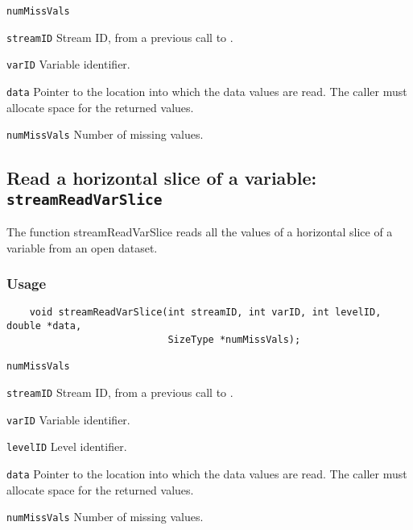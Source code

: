 \hspace*{4mm}\begin{minipage}[]{15cm}
\begin{deflist}{\texttt{numMissVals}\ }
\item[\texttt{streamID}]
Stream ID, from a previous call to {}.
\item[\texttt{varID}]
Variable identifier.
\item[\texttt{data}]
Pointer to the location into which the data values are read.
                     The caller must allocate space for the returned values.
\item[\texttt{numMissVals}]
Number of missing values.

\end{deflist}
\end{minipage}


\subsection{Read a horizontal slice of a variable: \texttt{streamReadVarSlice}}
\label{streamReadVarSlice}

The function streamReadVarSlice reads all the values of a horizontal slice of a variable
from an open dataset.
\subsubsection*{Usage}

\begin{verbatim}
    void streamReadVarSlice(int streamID, int varID, int levelID, double *data, 
                            SizeType *numMissVals);
\end{verbatim}

\hspace*{4mm}\begin{minipage}[]{15cm}
\begin{deflist}{\texttt{numMissVals}\ }
\item[\texttt{streamID}]
Stream ID, from a previous call to {}.
\item[\texttt{varID}]
Variable identifier.
\item[\texttt{levelID}]
Level identifier.
\item[\texttt{data}]
Pointer to the location into which the data values are read.
                     The caller must allocate space for the returned values.
\item[\texttt{numMissVals}]
Number of missing values.

\end{deflist}
\end{minipage}


